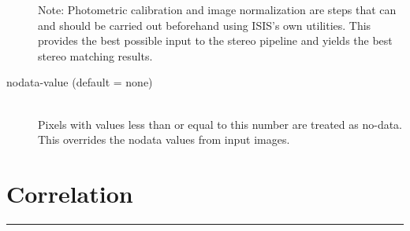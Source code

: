 \begin{description}
  Note: Photometric calibration and image normalization are steps that
  can and should be carried out beforehand using ISIS's own utilities.
  This provides the best possible input to the stereo pipeline and
  yields the best stereo matching results.

\item[nodata-value \textnormal (default = none)] \hfill \\
  Pixels with values less than or equal to this number are treated as
  no-data. This overrides the nodata values from input images.

\end{description}

\section{Correlation}
\hrule
\bigskip

